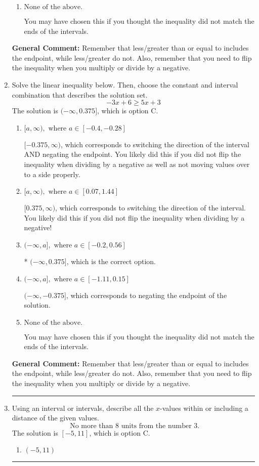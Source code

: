 \documentclass{extbook}[14pt]
\newcommand{\litem}[1]{\item #1

\rule{\textwidth}{0.4pt}}
\begin{document}
\begin{enumerate}
{\begin{enumerate}[label=\Alph*.]
 $[-4.065, \infty)$, which corresponds to negating the endpoint of the solution.
\item \( \text{None of the above}. \)

You may have chosen this if you thought the inequality did not match the ends of the intervals.
\end{enumerate}

\textbf{General Comment:} Remember that less/greater than or equal to includes the endpoint, while less/greater do not. Also, remember that you need to flip the inequality when you multiply or divide by a negative.
}
\litem{
Solve the linear inequality below. Then, choose the constant and interval combination that describes the solution set.
\[ -3x + 6 \geq 5x + 3 \]The solution is \( (-\infty, 0.375] \), which is option C.\begin{enumerate}[label=\Alph*.]
\item \( [a, \infty), \text{ where } a \in [-0.4, -0.28] \)

 $[-0.375, \infty)$, which corresponds to switching the direction of the interval AND negating the endpoint. You likely did this if you did not flip the inequality when dividing by a negative as well as not moving values over to a side properly.
\item \( [a, \infty), \text{ where } a \in [0.07, 1.44] \)

 $[0.375, \infty)$, which corresponds to switching the direction of the interval. You likely did this if you did not flip the inequality when dividing by a negative!
\item \( (-\infty, a], \text{ where } a \in [-0.2, 0.56] \)

* $(-\infty, 0.375]$, which is the correct option.
\item \( (-\infty, a], \text{ where } a \in [-1.11, 0.15] \)

 $(-\infty, -0.375]$, which corresponds to negating the endpoint of the solution.
\item \( \text{None of the above}. \)

You may have chosen this if you thought the inequality did not match the ends of the intervals.
\end{enumerate}

\textbf{General Comment:} Remember that less/greater than or equal to includes the endpoint, while less/greater do not. Also, remember that you need to flip the inequality when you multiply or divide by a negative.
}
\litem{
Using an interval or intervals, describe all the $x$-values within or including a distance of the given values.
\[ \text{ No more than } 8 \text{ units from the number } 3. \]The solution is \( [-5, 11] \), which is option C.\begin{enumerate}[label=\Alph*.]
\item \( (-5, 11) \)


\end{enumerate}}
\end{enumerate}
\end{document}
